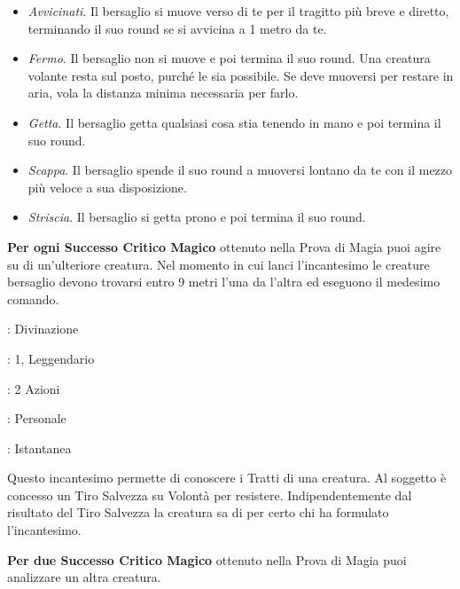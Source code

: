 \begin{multicols}{2}
\begin{itemize}[leftmargin=*] \setlength{\itemsep}{0pt}
	\item \emph{Avvicinati}. Il bersaglio si muove verso di te per il tragitto più breve e diretto, terminando il suo round se si avvicina a 1 metro da te.
	\item \emph{Fermo}. Il bersaglio non si muove e poi termina il suo round. Una creatura volante resta sul posto, purché le sia possibile. Se deve muoversi per restare in aria, vola la distanza minima necessaria per farlo.
	\item \emph{Getta}. Il bersaglio getta qualsiasi cosa stia tenendo in mano e poi termina il suo round.
	\item \emph{Scappa}. Il bersaglio spende il suo round a muoversi lontano da te con il mezzo più veloce a sua disposizione.
	\item \emph{Striscia}. Il bersaglio si getta prono e poi termina il suo round.
\end{itemize}

\textbf{Per ogni Successo Critico Magico} ottenuto nella Prova di Magia puoi agire su di un'ulteriore creatura. Nel momento in cui lanci l'incantesimo le creature bersaglio devono trovarsi entro 9 metri l'una da l'altra ed eseguono il medesimo comando.

\noindent\colorbox{OBSSgold!10}{
\begin{minipage}{0.95\linewidth}
\begin{description}[noitemsep, topsep=0pt, parsep=0pt, partopsep=0pt, leftmargin=0cm, labelwidth=1.3cm]
	\item[\textbf{Lista}]: Divinazione
	\item[\textbf{Livello}]: 1, Leggendario
	\item[\textbf{Lancio}]: 2 Azioni
	\item[\textbf{Gittata}]: Personale
	\item[\textbf{Durata}]: Istantanea
\end{description}
\end{minipage}}\smallskip

Questo incantesimo permette di conoscere i Tratti di una creatura. Al soggetto è concesso un Tiro Salvezza su Volontà per resistere. Indipendentemente dal risultato del Tiro Salvezza la creatura sa di per certo chi ha formulato l'incantesimo.

\textbf{Per due Successo Critico Magico} ottenuto nella Prova di Magia puoi analizzare un altra creatura.


\end{multicols}
